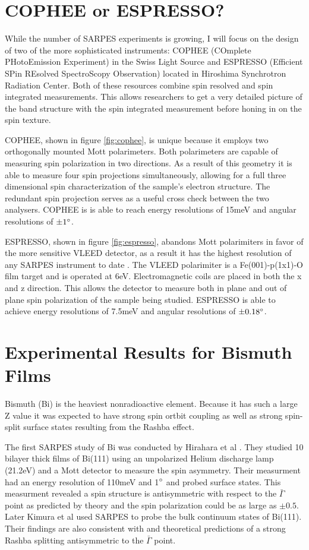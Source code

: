 \documentclass[12pt]{article}
\begin{document}
\section{COPHEE or ESPRESSO?}
While the number of SARPES experiments is growing, I will focus on the design of two of the more sophisticated instruments:  COPHEE (COmplete PHotoEmission Experiment) in the Swiss Light Source and ESPRESSO (Efficient SPin REsolved SpectroScopy Observation) located in Hiroshima Synchrotron Radiation Center.
Both of these resources combine spin resolved and spin integrated measurements.
This allows researchers to get a very detailed picture of the band structure with the spin integrated measurement before honing in on the spin texture.

COPHEE, shown in figure \ref{fig:cophee}, is unique because it employs two orthogonally mounted Mott polarimeters\cite{Hoesch}.
Both polarimeters are capable of measuring spin polarization in two directions.
As a result of this geometry it is able to measure four spin projections simultaneously, allowing for a full three dimensional spin characterization of the sample's electron structure.
The redundant spin projection serves as a useful cross check between the two analysers.
COPHEE is is able to reach energy resolutions of 15meV and angular resolutions of $\pm1\degree$.

ESPRESSO, shown in figure \ref{fig:espresso}, abandons Mott polarimiters in favor of the more sensitive VLEED detector, as a result it has the highest resolution of any SARPES instrument to date \cite{Okuda}.
The VLEED polarimiter is a Fe(001)-p(1x1)-O film target and is operated at 6eV.
Electromagnetic coils are placed in both the x and z direction.
This allows the detector to measure both in plane and out of plane spin polarization of the sample being studied.
ESPRESSO is able to achieve energy resolutions of 7.5meV and angular resolutions of $\pm0.18\degree$.

\section{Experimental Results for Bismuth Films}
Bismuth (Bi) is the heaviest nonradioactive element.
Because it has such a large Z value it was expected to have strong spin ortbit coupling as well as strong spin-split surface states resulting from the Rashba effect.

The first SARPES study of Bi was conducted by Hirahara et al \cite{Hirahara}.
They studied 10 bilayer thick films of Bi(111) using an unpolarized Helium discharge lamp (21.2eV) and a Mott detector to measure the spin asymmetry.
Their measurment had an energy resolution of 110meV and 1$\degree$ and probed surface states.
This measurment revealed a spin structure is antisymmetric with respect to the $\bar{\Gamma}$ point as predicted by theory and the spin polarization could be as large as $\pm 0.5$.
Later Kimura et al used SARPES to probe the bulk continuum states of Bi(111).
Their findings are also consistent with \cite{Hirahara} and theoretical predictions of a strong Rashba splitting antisymmetric to the $\bar{\Gamma}$ point.
\end{document}
